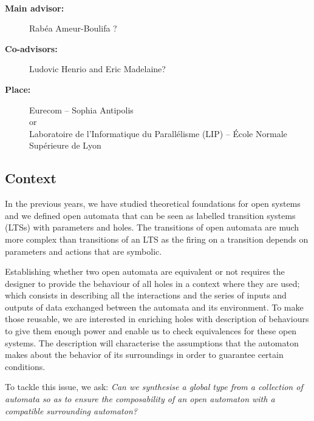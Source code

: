 \documentclass[11pt,fleqn]{article}
\begin{document}
\begin{center}
\\\bigskip
{}
\end{center}
\medskip

\begin{description}
\item[\bf Main advisor:] Rabéa Ameur-Boulifa ?
\item[\bf Co-advisors:] Ludovic Henrio and Eric Madelaine?
\item[\bf Place:] Eurecom  -- Sophia Antipolis
\\
or\\
Laboratoire de l'Informatique du Parallélisme (LIP) --
  \'Ecole Normale Supérieure de Lyon
\end{description}

\subsection*{Context}




In the previous years, we have studied theoretical foundations for open
systems and we defined  open automata \cite{arxiv-weakbisim,henrio:Forte2016,hou:hal-02406098} that can be seen as labelled transition systems (LTSs) with parameters and holes. The transitions of open
automata are much more complex than transitions of an LTS as the firing on a transition depends on parameters and actions that are symbolic.

Establishing  whether two open automata are equivalent  or not requires the designer to provide the behaviour of all holes in a context where they are used; which consists in describing all the interactions and the series of inputs and outputs of data exchanged  between the automata and its environment.  
To make those reusable, we are interested in enriching holes with description of behaviours to give them enough power and enable us to check equivalences for these open systems. The description will characterise the assumptions that the automaton makes about the behavior of its surroundings  in order to guarantee certain conditions.


To tackle this issue, we ask: { \it Can we synthesise a global type from a collection of automata so as to ensure the composability of an open automaton  with a compatible  surrounding automaton? }
\end{document}
